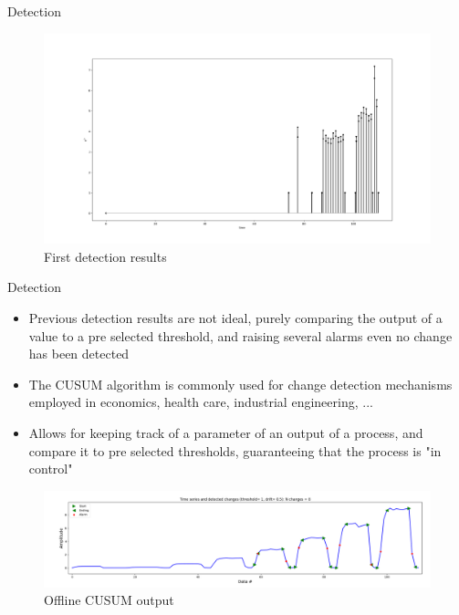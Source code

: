 \documentclass{beamer}
\begin{document}
\begin{frame}{Detection}
    \begin{figure}
        \includegraphics[width=1\textwidth]{meter_eleph/detect_dumb}
        \caption{First detection results}
    \end{figure}
\end{frame}

\begin{frame}{Detection}
    \begin{itemize}
        \item Previous detection results are not ideal, purely comparing the output
            of a value to a pre selected threshold, and raising several alarms
            even no change has been detected
            \pause
        \item The CUSUM algorithm is commonly used for change detection mechanisms employed
            in economics, health care, industrial engineering, ...
        \item Allows for keeping track of a parameter of an output of a process, and 
            compare it to pre selected thresholds, guaranteeing that the process is "in control"
    \end{itemize}
    \pause
    \begin{figure}
        \includegraphics[width=1\textwidth]{meter_eleph/offline_cusum_output}
        \caption{Offline CUSUM output}
    \end{figure}
\end{frame}
\end{document}
